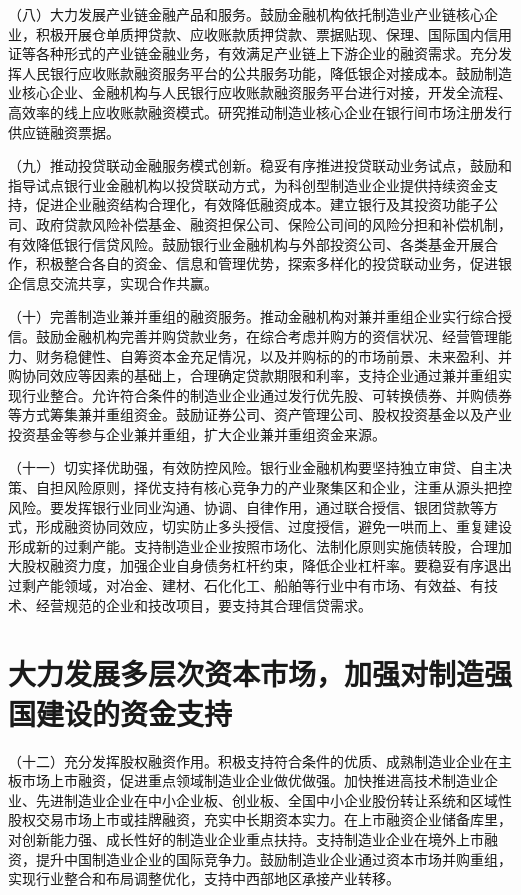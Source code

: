 （八）大力发展产业链金融产品和服务。鼓励金融机构依托制造业产业链核心企业，积极开展仓单质押贷款、应收账款质押贷款、票据贴现、保理、国际国内信用证等各种形式的产业链金融业务，有效满足产业链上下游企业的融资需求。充分发挥人民银行应收账款融资服务平台的公共服务功能，降低银企对接成本。鼓励制造业核心企业、金融机构与人民银行应收账款融资服务平台进行对接，开发全流程、高效率的线上应收账款融资模式。研究推动制造业核心企业在银行间市场注册发行供应链融资票据。

（九）推动投贷联动金融服务模式创新。稳妥有序推进投贷联动业务试点，鼓励和指导试点银行业金融机构以投贷联动方式，为科创型制造业企业提供持续资金支持，促进企业融资结构合理化，有效降低融资成本。建立银行及其投资功能子公司、政府贷款风险补偿基金、融资担保公司、保险公司间的风险分担和补偿机制，有效降低银行信贷风险。鼓励银行业金融机构与外部投资公司、各类基金开展合作，积极整合各自的资金、信息和管理优势，探索多样化的投贷联动业务，促进银企信息交流共享，实现合作共赢。

（十）完善制造业兼并重组的融资服务。推动金融机构对兼并重组企业实行综合授信。鼓励金融机构完善并购贷款业务，在综合考虑并购方的资信状况、经营管理能力、财务稳健性、自筹资本金充足情况，以及并购标的的市场前景、未来盈利、并购协同效应等因素的基础上，合理确定贷款期限和利率，支持企业通过兼并重组实现行业整合。允许符合条件的制造业企业通过发行优先股、可转换债券、并购债券等方式筹集兼并重组资金。鼓励证券公司、资产管理公司、股权投资基金以及产业投资基金等参与企业兼并重组，扩大企业兼并重组资金来源。

（十一）切实择优助强，有效防控风险。银行业金融机构要坚持独立审贷、自主决策、自担风险原则，择优支持有核心竞争力的产业聚集区和企业，注重从源头把控风险。要发挥银行业同业沟通、协调、自律作用，通过联合授信、银团贷款等方式，形成融资协同效应，切实防止多头授信、过度授信，避免一哄而上、重复建设形成新的过剩产能。支持制造业企业按照市场化、法制化原则实施债转股，合理加大股权融资力度，加强企业自身债务杠杆约束，降低企业杠杆率。要稳妥有序退出过剩产能领域，对冶金、建材、石化化工、船舶等行业中有市场、有效益、有技术、经营规范的企业和技改项目，要支持其合理信贷需求。

\section{大力发展多层次资本市场，加强对制造强国建设的资金支持}

（十二）充分发挥股权融资作用。积极支持符合条件的优质、成熟制造业企业在主板市场上市融资，促进重点领域制造业企业做优做强。加快推进高技术制造业企业、先进制造业企业在中小企业板、创业板、全国中小企业股份转让系统和区域性股权交易市场上市或挂牌融资，充实中长期资本实力。在上市融资企业储备库里，对创新能力强、成长性好的制造业企业重点扶持。支持制造业企业在境外上市融资，提升中国制造业企业的国际竞争力。鼓励制造业企业通过资本市场并购重组，实现行业整合和布局调整优化，支持中西部地区承接产业转移。

